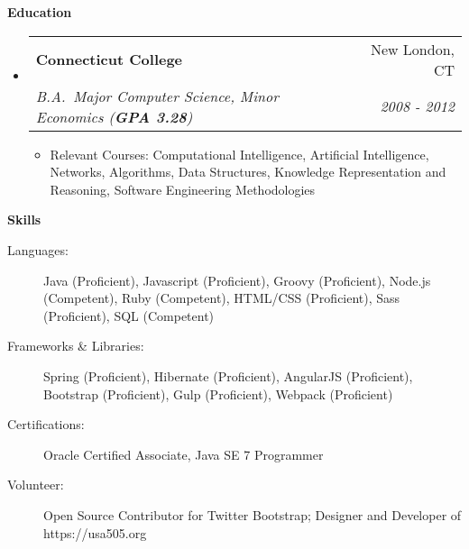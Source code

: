 \documentclass[letterpaper,11pt]{article}
\makeatletter
\newcommand{\resitem}[1]{\item #1 \vspace{-2pt}}
\newcommand{\resheading}[1]{{\large \colorbox{mygrey}{\begin{minipage}{\textwidth}{\textbf{#1 \vphantom{p\^{E}}}}\end{minipage}}}}
\newcommand{\ressubheading}[4]{
\begin{tabular*}{7.0in}{l@{\extracolsep{\fill}}r}
    \textbf{#1} & #2 \\
    \textit{#3} & \textit{#4} \\
\end{tabular*}\vspace{-6pt}}
\makeatother
\begin{document}
    \resheading{Education}
    \begin{itemize}
        \item
        \ressubheading{Connecticut College}{New London, CT}{B.A.\ Major Computer Science, Minor Economics (\textbf{GPA 3.28})}{2008 - 2012}
        \begin{itemize}
            \resitem{Relevant Courses: Computational Intelligence, Artificial Intelligence, Networks, Algorithms, Data Structures, Knowledge Representation and Reasoning, Software Engineering Methodologies}
        \end{itemize}
    \end{itemize}

    \resheading{Skills}
    \begin{description}
        \item[Languages:]
        Java (Proficient), Javascript (Proficient), Groovy (Proficient), Node.js (Competent), Ruby (Competent), HTML/CSS (Proficient), Sass (Proficient), SQL (Competent)
        \item[Frameworks \& Libraries:]
        Spring (Proficient), Hibernate (Proficient), AngularJS (Proficient), Bootstrap (Proficient), Gulp (Proficient), Webpack (Proficient)
        \item[Certifications:]
        Oracle Certified Associate, Java SE 7 Programmer
        \item[Volunteer:]
        Open Source Contributor for Twitter Bootstrap;
        Designer and Developer of https://usa505.org
    \end{description}
\end{document}
